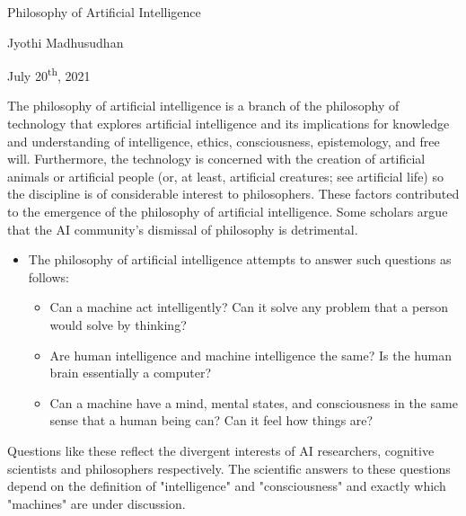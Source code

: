 \documentclass[12pt]{article}
\begin{document}
\begin{center}
{\Large Philosophy of Artificial Intelligence}
\end{center}


\begin{center}
Jyothi Madhusudhan 
\end{center}


\begin{center}
July 20\textsuperscript{th}, 2021
\end{center}


\vspace{0\baselineskip}
The philosophy of artificial intelligence is a branch of the philosophy of technology that explores artificial intelligence and its implications for knowledge and understanding of intelligence, ethics, consciousness, epistemology, and free will. Furthermore, the technology is concerned with the creation of artificial animals or artificial people (or, at least, artificial creatures; see artificial life) so the discipline is of considerable interest to philosophers. These factors contributed to the emergence of the philosophy of artificial intelligence. Some scholars argue that the AI community's dismissal of philosophy is detrimental.

\begin{itemize}
	\item The philosophy of artificial intelligence attempts to answer such questions as follows:

\vspace{1\baselineskip}
\begin{itemize}
	\item Can a machine act intelligently? Can it solve any problem that a person would solve by thinking?

	\item Are human intelligence and machine intelligence the same? Is the human brain essentially a computer?

	\item Can a machine have a mind, mental states, and consciousness in the same sense that a human being can? Can it feel how things are?

\end{itemize}
\end{itemize}
Questions like these reflect the divergent interests of AI researchers, cognitive scientists and philosophers respectively. The scientific answers to these questions depend on the definition of "intelligence" and "consciousness" and exactly which "machines" are under discussion.
\end{document}
